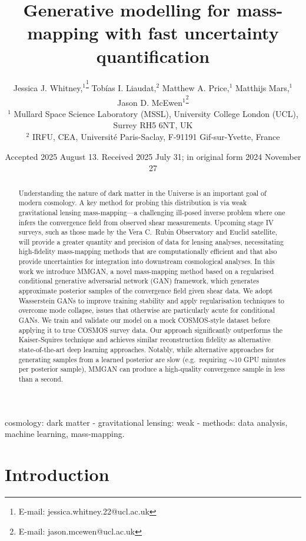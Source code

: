 \documentclass[fleqn,usenatbib]{mnras}
\title[Generative mass-mapping with fast UQ]{Generative modelling for mass-mapping with fast uncertainty quantification}
\author[Jessica J. Whitney et al.]{
Jessica J. Whitney,$^{1}$\textsuperscript{\thanks{E-mail: jessica.whitney.22@ucl.ac.uk}}
Tobías I. Liaudat,$^{2}$
Matthew A. Price,$^{1}$
Matthijs Mars,$^{1}$
Jason D. McEwen$^{1}$\textsuperscript{\thanks{E-mail: jason.mcewen@ucl.ac.uk}}
\\
$^{1}$ Mullard Space Science Laboratory (MSSL), University College London (UCL), Surrey RH5 6NT, UK\\
$^{2}$ IRFU, CEA, Université Paris-Saclay, F-91191 Gif-sur-Yvette, France
}
\date{Accepted 2025 August 13. Received 2025 July 31; in original form 2024 November 27}
\begin{document}
\label{firstpage}
\pagerange{\pageref{firstpage}--\pageref{lastpage}}
\maketitle


\begin{abstract}
	Understanding the nature of dark matter in the Universe is an important goal of modern cosmology. A key method for probing this distribution is via weak gravitational lensing mass-mapping---a challenging ill-posed inverse problem where one infers the convergence field from observed shear measurements. Upcoming stage IV surveys, such as those made by the Vera C.\ Rubin Observatory and Euclid satellite, will provide a greater quantity and precision of data for lensing analyses, necessitating high-fidelity mass-mapping methods that are computationally efficient and that also provide uncertainties for integration into downstream cosmological analyses.  In this work we introduce MMGAN, a novel mass-mapping method based on a regularised conditional generative adversarial network (GAN) framework, which generates approximate posterior samples of the convergence field given shear data. We adopt Wasserstein GANs to improve training stability and apply regularisation techniques to overcome mode collapse, issues that otherwise are particularly acute for conditional GANs. We train and validate our model on a mock COSMOS-style dataset before applying it to true COSMOS survey data. Our approach significantly outperforms the Kaiser-Squires technique and achieves similar reconstruction fidelity as alternative state-of-the-art deep learning approaches.  Notably, while alternative approaches for generating samples from a learned posterior are slow (e.g.\ requiring $\sim$10 GPU minutes per posterior sample), MMGAN can produce a high-quality convergence sample in less than a second. 
\end{abstract}

\begin{keywords}
	cosmology: dark matter - gravitational lensing: weak - methods: data analysis, machine learning, mass-mapping.
\end{keywords}

\section{Introduction}\label{sec:introduction}
\end{document}
